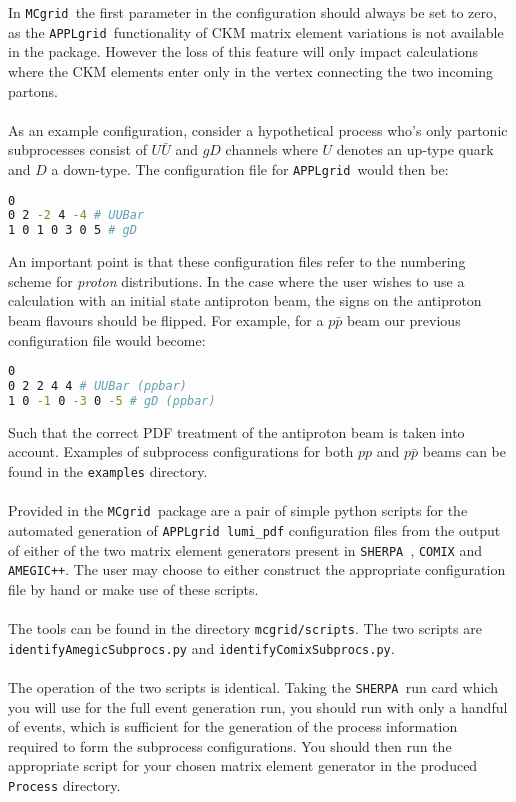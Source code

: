 \documentclass[11pt]{article}
\newcommand{\mcgrid} {{\tt MCgrid }}
\newcommand{\appl} {{\tt APPLgrid }}
\newcommand{\sherpa} {{\tt SHERPA }}
\begin{document}
In \mcgrid the first parameter in the configuration should always be set to zero, as the \appl functionality of CKM matrix element variations is not available in the package. However the loss of this feature will only impact calculations where the CKM elements enter only in the vertex connecting the two incoming partons.  \\\\
As an example configuration, consider a hypothetical process who's only partonic subprocesses consist of $U\bar{U}$ and $gD$ channels where $U$ denotes an up-type quark and $D$ a down-type. The configuration file for \appl would then be:
\begin{lstlisting}[language=bash]
0 
0 2 -2 4 -4 # UUBar
1 0 1 0 3 0 5 # gD
\end{lstlisting}
An important point is that these configuration files refer to the numbering scheme for \emph{proton} distributions. In the case where the user wishes to use a calculation with an initial state antiproton beam, the signs on the antiproton beam flavours should be flipped. For example, for a $p\bar{p}$ beam our previous configuration file would become:
\begin{lstlisting}[language=bash]
0
0 2 2 4 4 # UUBar (ppbar)
1 0 -1 0 -3 0 -5 # gD (ppbar)
\end{lstlisting}
Such that the correct PDF treatment of the antiproton beam is taken into account. Examples of subprocess configurations for both $pp$ and $p\bar{p}$ beams can be found in the \lstinline[language=bash]{examples} directory.\\\\
Provided in the \mcgrid package are a pair of simple python scripts for the automated generation of \appl \lstinline[language=c++]{lumi_pdf} configuration files from the output of either of the two matrix element generators present in \sherpa, {\tt COMIX}\cite{Gleisberg:2008fv} and {\tt AMEGIC++}\cite{Krauss:2001iv}. The user may choose to either construct the appropriate configuration file by hand or make use of these scripts.\\\\
The tools can be found in the directory \lstinline[language=bash]{mcgrid/scripts}. The two scripts are \\\lstinline[language=bash]{identifyAmegicSubprocs.py} and  \lstinline[language=bash]{identifyComixSubprocs.py}.
\\\\
The operation of the two scripts is identical. Taking the \sherpa run card which you will use for the full event generation run, you should run with only a handful of events, which is sufficient for the generation of the process information required to form the subprocess configurations. You should then run the appropriate script for your chosen matrix element generator in the produced \lstinline[language=bash]{Process} directory.
\end{document}
